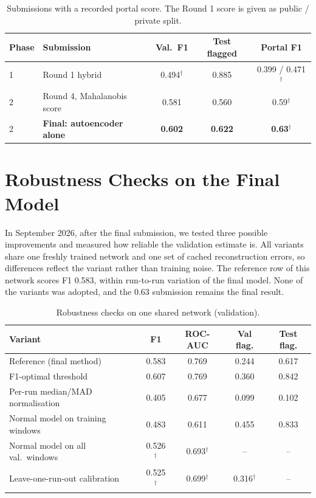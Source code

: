 \documentclass[runningheads]{llncs}
\newcommand{\doc}{$^\dagger$}
\begin{document}
\begin{table}[ht]
\centering
\caption{Submissions with a recorded portal score. The Round 1 score is given as public / private split.}\label{tab:portal}
\begin{tabular}{llccc}
\toprule
Phase & Submission & Val.\ F1 & Test flagged & Portal F1 \\
\midrule
1 & Round 1 hybrid & 0.494\doc & 0.885 & 0.399 / 0.471\doc \\
2 & Round 4, Mahalanobis score & 0.581 & 0.560 & 0.59\doc \\
2 & \textbf{Final: autoencoder alone} & \textbf{0.602} & \textbf{0.622} & \textbf{0.63}\doc \\
\bottomrule
\end{tabular}
\end{table}

\section{Robustness Checks on the Final Model}\label{sec:robust}

In September 2026, after the final submission, we tested three possible improvements and measured how reliable the validation estimate is. All variants share one freshly trained network and one set of cached reconstruction errors, so differences reflect the variant rather than training noise. The reference row of this network scores F1 0.583, within run-to-run variation of the final model. None of the variants was adopted, and the 0.63 submission remains the final result.

\begin{table}[ht]
\centering
\caption{Robustness checks on one shared network (validation).}\label{tab:robust}
\begin{tabular}{lcccc}
\toprule
Variant & F1 & ROC-AUC & Val flag. & Test flag. \\
\midrule
Reference (final method) & 0.583 & 0.769 & 0.244 & 0.617 \\
F1-optimal threshold & 0.607 & 0.769 & 0.360 & 0.842 \\
Per-run median/MAD normalisation & 0.405 & 0.677 & 0.099 & 0.102 \\
Normal model on training windows & 0.483 & 0.611 & 0.455 & 0.833 \\
Normal model on all val.\ windows & 0.526\doc & 0.693\doc & -- & -- \\
Leave-one-run-out calibration & 0.525\doc & 0.699\doc & 0.316\doc & -- \\
\bottomrule
\end{tabular}
\end{table}
\end{document}
